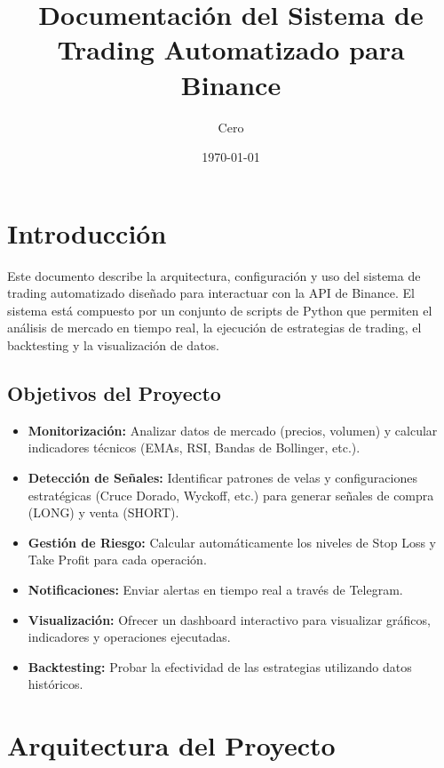 \documentclass[12pt, a4paper]{article}
\title{Documentación del Sistema de Trading Automatizado para Binance}
\author{Cero}
\date{\today}
\begin{document}
\maketitle
\tableofcontents
\newpage

\section{Introducción}

Este documento describe la arquitectura, configuración y uso del sistema de trading automatizado diseñado para interactuar con la API de Binance. El sistema está compuesto por un conjunto de scripts de Python que permiten el análisis de mercado en tiempo real, la ejecución de estrategias de trading, el backtesting y la visualización de datos.

\subsection{Objetivos del Proyecto}
\begin{itemize}
    \item \textbf{Monitorización:} Analizar datos de mercado (precios, volumen) y calcular indicadores técnicos (EMAs, RSI, Bandas de Bollinger, etc.).
    \item \textbf{Detección de Señales:} Identificar patrones de velas y configuraciones estratégicas (Cruce Dorado, Wyckoff, etc.) para generar señales de compra (LONG) y venta (SHORT).
    \item \textbf{Gestión de Riesgo:} Calcular automáticamente los niveles de Stop Loss y Take Profit para cada operación.
    \item \textbf{Notificaciones:} Enviar alertas en tiempo real a través de Telegram.
    \item \textbf{Visualización:} Ofrecer un dashboard interactivo para visualizar gráficos, indicadores y operaciones ejecutadas.
    \item \textbf{Backtesting:} Probar la efectividad de las estrategias utilizando datos históricos.
\end{itemize}

\section{Arquitectura del Proyecto}
\end{document}

